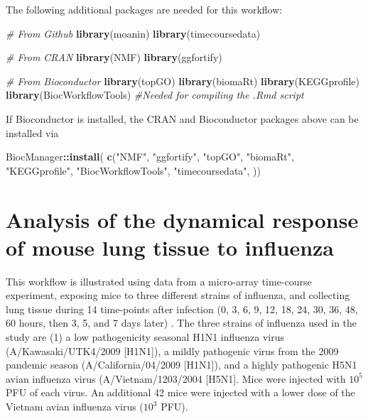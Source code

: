 \documentclass[9pt,a4paper,]{extarticle}
\newenvironment{Shaded}{\begin{snugshade}}{\end{snugshade}}
\newcommand{\CommentTok}[1]{\textcolor[rgb]{0.56,0.35,0.01}{\textit{#1}}}
\newcommand{\KeywordTok}[1]{\textcolor[rgb]{0.13,0.29,0.53}{\textbf{#1}}}
\newcommand{\NormalTok}[1]{#1}
\newcommand{\OperatorTok}[1]{\textcolor[rgb]{0.81,0.36,0.00}{\textbf{#1}}}
\newcommand{\StringTok}[1]{\textcolor[rgb]{0.31,0.60,0.02}{#1}}
\begin{document}
The following additional packages are needed for this workflow:

\begin{Shaded}
\begin{Highlighting}[]
\CommentTok{# From Github}
\KeywordTok{library}\NormalTok{(moanin)}
\KeywordTok{library}\NormalTok{(timecoursedata)}

\CommentTok{# From CRAN}
\KeywordTok{library}\NormalTok{(NMF)}
\KeywordTok{library}\NormalTok{(ggfortify)}

\CommentTok{# From Bioconductor}
\KeywordTok{library}\NormalTok{(topGO)}
\KeywordTok{library}\NormalTok{(biomaRt)}
\KeywordTok{library}\NormalTok{(KEGGprofile)}
\KeywordTok{library}\NormalTok{(BiocWorkflowTools) }\CommentTok{#Needed for compiling the .Rmd script}
\end{Highlighting}
\end{Shaded}

If Bioconductor is installed, the CRAN and Bioconductor packages above can be installed via

\begin{Shaded}
\begin{Highlighting}[]
\NormalTok{BiocManager}\OperatorTok{::}\KeywordTok{install}\NormalTok{(}
    \KeywordTok{c}\NormalTok{(}\StringTok{"NMF"}\NormalTok{, }\StringTok{"ggfortify"}\NormalTok{, }\StringTok{"topGO"}\NormalTok{, }\StringTok{"biomaRt"}\NormalTok{,}
      \StringTok{"KEGGprofile"}\NormalTok{, }\StringTok{"BiocWorkflowTools"}\NormalTok{, }\StringTok{"timecoursedata"}\NormalTok{, ))}
\end{Highlighting}
\end{Shaded}

\hypertarget{analysis-of-the-dynamical-response-of-mouse-lung-tissue-to-influenza}{%
\section{Analysis of the dynamical response of mouse lung tissue to influenza}\label{analysis-of-the-dynamical-response-of-mouse-lung-tissue-to-influenza}}

This workflow is illustrated using data from a micro-array time-course
experiment, exposing mice to three different strains of influenza, and
collecting lung tissue during 14 time-points after infection (0, 3, 6, 9, 12,
18, 24, 30, 36, 48, 60 hours, then 3, 5, and 7 days later)
\citep{shoemaker:ultrasensitive}. The three strains of influenza used in the
study are (1) a low pathogenicity seasonal H1N1 influenza virus
(A/Kawasaki/UTK4/2009 {[}H1N1{]}), a mildly pathogenic virus from the 2009
pandemic season (A/California/04/2009 {[}H1N1{]}), and a highly pathogenic H5N1
avian influenza virus (A/Vietnam/1203/2004 {[}H5N1{]}. Mice were injected with
\(10^5\) PFU of each virus. An additional 42 mice were injected with a lower dose
of the Vietnam avian influenza virus (\(10^3\) PFU).
\end{document}
